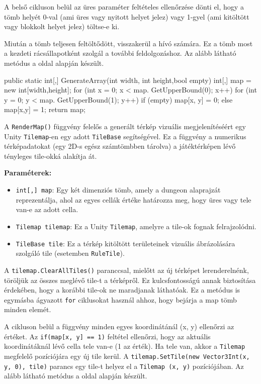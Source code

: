 A belső cikluson belül az üres paraméter feltételes ellenőrzése dönti el, hogy a tömb helyét 0-val (ami üres vagy nyitott helyet jelez) vagy 1-gyel (ami kitöltött vagy blokkolt helyet jelez) töltse-e ki.

Miután a tömb teljesen feltöltődött, visszakerül a hívó számára. Ez a tömb most a kezdeti rácsállapotként szolgál a további feldolgozáshoz. Az alább látható metódus a \cite{mapgenerator} oldal alapján készült.

\begin{java}
public static int[,] GenerateArray(int width, 
    int height,bool empty)
{
    int[,] map = new int[width,height];
    for (int x = 0; x < map.
        GetUpperBound(0); x++)
    {
        for (int y = 0; y < map.
            GetUpperBound(1); y++)
        {
            if (empty)
            {
                map[x, y] = 0;
            }
            else
            {
                map[x,y] = 1;
            }
        }
    }
    return map;
}
\end{java}


A \texttt{RenderMap()} függvény felelős a generált térkép vizuális megjelenítéséért egy Unity \texttt{Tilemap}-en egy adott \texttt{TileBase} segítségével. Ez a függvény a numerikus térképadatokat (egy 2D-s egész számtömbben tárolva) a játéktérképen lévő tényleges tile-okká alakítja át.

\textbf{Paraméterek:}
\begin{itemize}
\item \texttt{int[,] map}: Egy két dimenziós tömb, amely a dungeon alaprajzát reprezentálja, ahol az egyes cellák értéke határozza meg, hogy üres vagy tele van-e az adott cella.
\item \texttt{Tilemap tilemap}: Ez a Unity \texttt{Tilemap}, amelyre a tile-ok fognak felrajzolódni.
\item \texttt{TileBase tile}: Ez a térkép kitöltött területeinek vizuális ábrázolására szolgáló tile (esetemben \texttt{RuleTile}).
\end{itemize}

A \texttt{tilemap.ClearAllTiles()} paranccsal, mielőtt az új térképet lerenderelnénk, töröljük az összes meglévő tile-t a térképről. Ez kulcsfontosságú annak biztosítása érdekében, hogy a korábbi tile-ok ne maradjanak láthatóak. Ez a metódus is egymásba ágyazott \texttt{for} ciklusokat használ ahhoz, hogy bejárja a map tömb minden elemét. 

A cikluson belül a függvény minden egyes koordinátánál (x, y) ellenőrzi az értéket. Az \texttt{if(map[x, y] == 1)} feltétel ellenőrzi, hogy az aktuális koordinátáknál lévő cella tele van-e (1 az érték). Ha tele van, akkor a \texttt{Tilemap} megfelelő pozíciójára egy új tile kerül. A \texttt{tilemap.SetTile(new Vector3Int(x, y, 0), tile)} parancs egy tile-t helyez el a \texttt{Tilemap (x, y)} pozíciójában. Az alább látható metódus a \cite{mapgenerator} oldal alapján készült.

